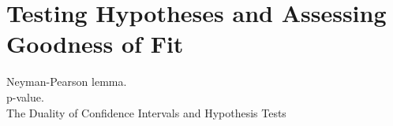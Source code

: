 \documentclass[paper=a4, fontsize=11pt]{scrartcl} %
\numberwithin{equation}{section} %
\numberwithin{figure}{section} %
\numberwithin{table}{section} %
\begin{document}
\section{Testing Hypotheses and Assessing Goodness of Fit}
Neyman-Pearson lemma.\\
p-value.\\
The Duality of Confidence Intervals and Hypothesis Tests
\end{document}
